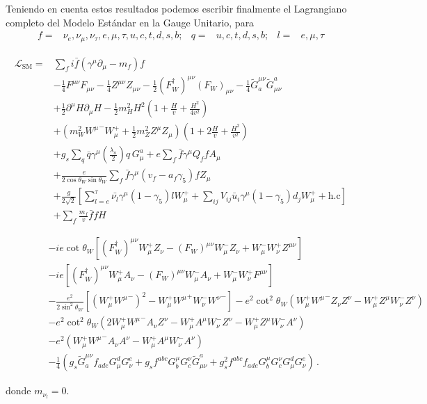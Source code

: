 \begin{frame}
\newpage{}

Teniendo en cuenta estos resultados podemos escribir finalmente el Lagrangiano completo del Modelo Estándar en la Gauge Unitario, para
\begin{align}
  f=&\nu_e,\nu_\mu,\nu_\tau,e,\mu,\tau,u,c,t,d,s,b;&q=&u,c,t,d,s,b;&l=&e,\mu,\tau
\end{align}

\begin{align}
   \mathcal{L}_{\text{SM}}=&\sum_f i\bar{f}\left(\gamma^\mu\partial_\mu-m_f\right)f\nonumber\\
&-\tfrac{1}{4}F^{\mu\nu} F_{\mu\nu}-\tfrac{1}{4}Z^{\mu\nu} Z_{\mu\nu}-\tfrac{1}{2}(F_W^\dagger)^{\mu\nu} (F_W)_{\mu\nu}
- \tfrac{1}{4}\widetilde{G}^{\mu\nu}_a \widetilde{G}_{\mu\nu}^a\nonumber\\
&+\tfrac{1}{2}\partial^\mu H\partial_\mu H
-\frac{1}{2}m_H^2H^2\left(1+\frac{H}{v}+\frac{H^2}{4v^2}\right)\nonumber\\
&+\left(m_W^2{W^\mu}^-W_\mu^++\frac{1}{2}m_Z^2Z^\mu Z_\mu\right)\left(1+2\frac{H}{v}+\frac{H^2}{v^2}\right)\nonumber\\
&+g_s\sum_q\bar{q}\gamma^\mu\left(\frac{\lambda_a}{2}\right)q\,G_\mu^a+e\sum_f \bar{f}\gamma^\mu Q_f f A_\mu\nonumber\\
&+\frac{e}{2\cos\theta_W\sin\theta_W}\sum_{f}\bar{f}\gamma^\mu(v_f-a_f\gamma_5)f Z_\mu\nonumber\\
&+\frac{g}{2\sqrt{2}}\left[\sum_{l=e}^{\tau}\bar{\nu_l}\gamma^\mu(1-\gamma_5)l W_\mu^++\sum_{ij}V_{ij}\bar{u}_i\gamma^\mu(1-\gamma_5)d_j W_\mu^++\text{h.c}\right]\nonumber\\
&+\sum_f \frac{m_f}{v} \bar{f}f H\nonumber
\end{align}

\end{frame}
\begin{frame}{}
\begin{align}
     \label{eq:234qft}
\phantom{\mathcal{L}_{\text{SM}}=}&-ie\cot\theta_W\left[(F_W^\dagger)^{\mu\nu}W_\mu^+ Z_\nu-(F_W)^{\mu\nu}W_\mu^- Z_\nu+W_\mu^-W_\nu^+Z^{\mu\nu}\right]\nonumber\\
&-ie\left[(F_W^\dagger)^{\mu\nu}W_\mu^+ A_\nu-(F_W)^{\mu\nu}W_\mu^- A_\nu+W_\mu^-W_\nu^+F^{\mu\nu}\right]\nonumber\\
&-\frac{e^2}{2\sin^2\theta_W}\left[\left(W_\mu^+{W^\mu}^-\right)^2-W_\mu^+{W^\mu}^+W_\nu^-{W^\nu}^-\right]
-e^2\cot^2\theta_W\left(W_\mu^+{W^\mu}^-Z_\nu Z^\nu-W_\mu^+Z^\mu W_\nu^-Z^\nu\right)\nonumber\\
&-e^2\cot^2\theta_W\left(2W_\mu^+{W^\mu}^-A_\nu Z^\nu-W_\mu^+A^\mu W_\nu^-Z^\nu-W_\mu^+Z^\mu W_\nu^-A^\nu\right)\nonumber\\
&-e^2\left(W_\mu^+{W^\mu}^-A_\nu A^\nu-W_\mu^+A^\mu W_\nu^-A^\nu\right)\nonumber\\
&- \frac{1}{4}\left(g_s\widetilde{G}^{\mu\nu}_af_{a d e}G^d_\mu G^e_\nu
    +g_sf^{a b c}G_b^\mu G_c^\nu\widetilde{G}_{\mu\nu}^a
    +g_s^2f^{a b c}f_{a d e}G_b^\mu G_c^\nu G^d_\mu G^e_\nu\right)\,.
\end{align}


donde $m_{\nu_l}=0$.

\end{frame}


